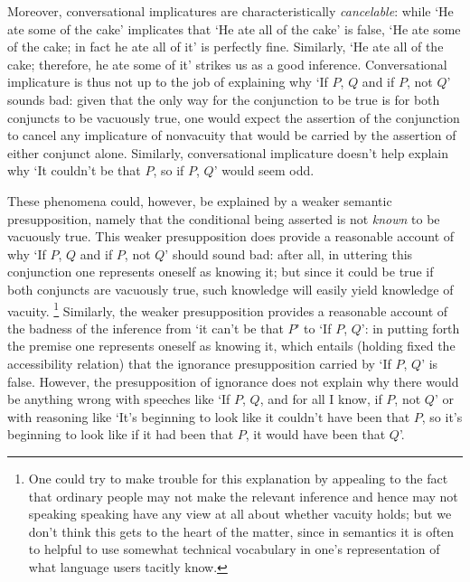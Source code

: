 \documentclass[If.tex]{subfiles}
\begin{document}
Moreover, conversational implicatures are characteristically \emph{cancelable}: while ‘He ate some of the cake’ implicates that ‘He ate all of the cake’ is false, ‘He ate some of the cake; in fact he ate all of it’ is perfectly fine.  Similarly, ‘He ate all of the cake; therefore, he ate some of it’ strikes us as a good inference.  Conversational implicature is thus not up to the job of explaining why ‘If $P$, $Q$ and if $P$, not $Q$’ sounds bad: given that the only way for the conjunction to be true is for both conjuncts to be vacuously true, one would expect the assertion of the conjunction to cancel any implicature of nonvacuity that would be carried by the assertion of either conjunct alone.  Similarly, conversational implicature doesn't help explain why ‘It couldn't be that $P$, so if $P$, $Q$’ would seem odd.  


These phenomena could, however, be explained by a weaker semantic presupposition, namely that the conditional being asserted is not \emph{known} to be vacuously true.  This weaker presupposition does provide a reasonable account of why ‘If $P$, $Q$ and if $P$, not $Q$’ should sound bad: after all, in uttering this conjunction one represents oneself as knowing it; but since it could be true if both conjuncts are vacuously true, such knowledge will easily yield knowledge of vacuity.%
\footnote{One could try to make trouble for this explanation by appealing to the fact that ordinary people may not make the relevant inference and hence may not speaking speaking have any view at all about whether vacuity holds; but we don't think this gets to the heart of the matter, since in semantics it is often to helpful to use somewhat technical vocabulary in one's representation of what language users tacitly know.}
Similarly, the weaker presupposition provides a reasonable account of the badness of the inference from ‘it can't be that $P$’ to ‘If $P$, $Q$’: in putting forth the premise one represents oneself as knowing it, which entails (holding fixed the accessibility relation) that the ignorance presupposition carried by ‘If $P$, $Q$’ is false.  However, the presupposition of ignorance does not explain why there would be anything wrong with speeches like ‘If $P$, $Q$, and for all I know, if $P$, not $Q$’ or with reasoning like ‘It's beginning to look like it couldn't have been that $P$, so it's beginning to look like if it had been that $P$, it would have been that $Q$’.  
\end{document}
